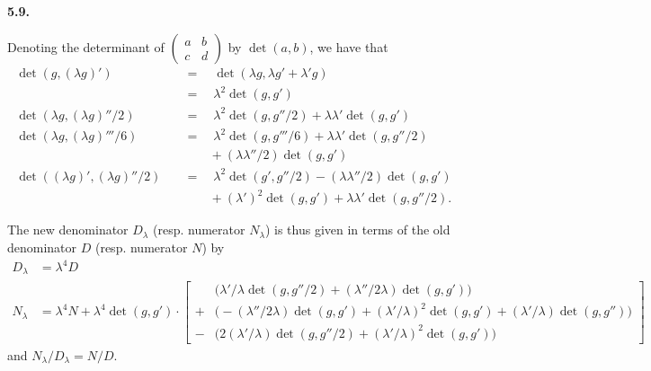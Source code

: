 \documentclass{report}
\newenvironment{rmenv}[1]
  {\phantomsection\par\medskip\noindent\textbf{#1.}\rmfamily}
  {\par\medskip}
\newcommand{\detrow}[2]{\operatorname{det}(#1,#2)}
\begin{document}
\begin{rmenv}{5.9}
\begin{enumerate}[(i)]
      Denoting the determinant of $\left(\begin{array}{cc}a&b\\c&d\end{array}\right)$ by $\detrow{a}{b}$, we have that
      \[
        \begin{aligned}
          \detrow{g}{(\lambda g)'}
          \quad&=\quad \detrow{\lambda g}{\lambda g'+\lambda' g}
        \\[0.5em]
          &=\quad \lambda^2\detrow{g}{g'}
        \\[1em]
          \detrow{\lambda g}{(\lambda g)''/2}
          \quad&=\quad \lambda^2\detrow{g}{g''/2}
          + \lambda\lambda'\detrow{g}{g'}
        \\[1em]
          \detrow{\lambda g}{(\lambda g)'''/6}
          \quad&=\quad \lambda^2\detrow{g}{g'''/6}
          + \lambda\lambda'\detrow{g}{g''/2}
        \\[0.5em]
          &\qquad+ (\lambda\lambda''/2)\detrow{g}{g'}
        \\[1em]
          \detrow{(\lambda g)'}{(\lambda g)''/2}
          \quad&=\quad \lambda^2\detrow{g'}{g''/2}
          - (\lambda\lambda''/2)\detrow{g}{g'}
        \\[0.5em]
          &\qquad+ (\lambda')^2\detrow{g}{g'}
          + \lambda\lambda'\detrow{g}{g''/2}.
        \end{aligned}
      \]

      The new denominator $D_\lambda$ (resp. numerator $N_\lambda$) is thus given in terms of the old denominator $D$ (resp. numerator $N$) by
      \[
        \begin{aligned}
          D_\lambda
          &= \lambda^4 D
        \\N_\lambda
          &= \lambda^4 N + \lambda^4\detrow{g}{g'}\cdot
          \left[
            \begin{aligned}
              &\Big(
                \lambda'/\lambda\detrow{g}{g''/2}
                + (\lambda''/2\lambda)\detrow{g}{g'}
              \Big)
            \\+&\Big(
                -(\lambda''/2\lambda)\detrow{g}{g'}
                +(\lambda'/\lambda)^2\detrow{g}{g'}
                +(\lambda'/\lambda)\detrow{g}{g''}
              \Big)
            \\-&\Big(
                2(\lambda'/\lambda)\detrow{g}{g''/2}
                + (\lambda'/\lambda)^2\detrow{g}{g'}
              \Big)
            \end{aligned}
          \right]
        \end{aligned}
      \]
      and $N_\lambda/D_\lambda=N/D$.


\end{enumerate}
\end{rmenv}
\end{document}
